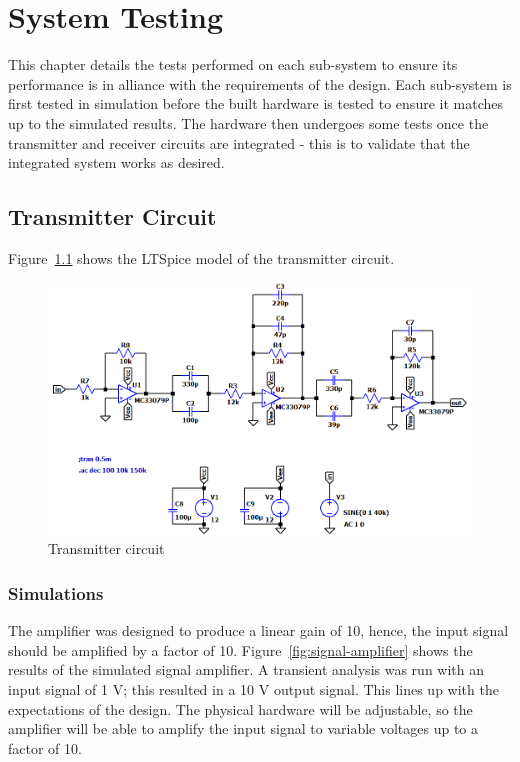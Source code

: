 \documentclass[class=report,11pt,crop=false]{standalone}
\begin{document}
\chapter{System Testing \label{ch:testing}}
\vspace{-1cm}
This chapter details the tests performed on each sub-system to ensure its performance is in alliance with the requirements of the design. Each sub-system is first tested in simulation before the built hardware is tested to ensure it matches up to the simulated results. The hardware then undergoes some tests once the transmitter and receiver circuits are integrated - this is to validate that the integrated system works as desired.


\section{Transmitter Circuit}
Figure~\ref{fig:transmitter-circuit} shows the LTSpice model of the transmitter circuit.  

\begin{figure}[htbp]
    \centering
    \includegraphics[width=0.8\columnwidth]{../Images/transmitter_circuit_diagram.png}
    \caption{Transmitter circuit}
    \label{fig:transmitter-circuit}
\end{figure}

\subsection{Simulations}\label{sect:transmitter-simulations}
The amplifier was designed to produce a linear gain of 10, hence, the input signal should be amplified by a factor of 10. Figure~\ref{fig:signal-amplifier} shows the results of the simulated signal amplifier. A transient analysis was run with an input signal of 1 V; this resulted in a 10 V output signal. This lines up with the expectations of the design. The physical hardware will be adjustable, so the amplifier will be able to amplify the input signal to variable voltages up to a factor of 10.
\end{document}

